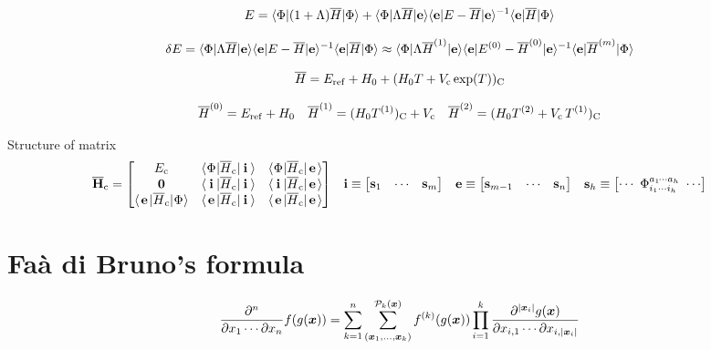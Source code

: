 \documentclass[11pt]{article}
\numberwithin{equation}{section}
\newcommand{\fwkt}[1]{\kt{\makebox[0.8em][c]{\ensuremath{#1}}}}
\newcommand{\fwbr}[1]{\br{\makebox[0.8em][c]{\ensuremath{#1}}}}
\begin{document}
\begin{align*}
  E
=
  \langle\Phi |
  (
    1
  +
    \Lambda 
  )
  \overline{H}
  |\Phi \rangle
+
  \langle\Phi |\Lambda \overline{H}|\mathbf{e}\rangle
  \langle\mathbf{e}|E - \overline{H}|\mathbf{e}\rangle^{-1}
  \langle\mathbf{e}|\overline{H}|\Phi \rangle
\end{align*}

\begin{align*}
  \delta  E
=
  \langle\Phi |\Lambda \overline{H}|\mathbf{e}\rangle
  \langle\mathbf{e}|E - \overline{H}|\mathbf{e}\rangle^{-1}
  \langle\mathbf{e}|\overline{H}|\Phi \rangle
\approx
  \langle\Phi |\Lambda \overline{H}^{(1)}|\mathbf{e}\rangle
  \langle\mathbf{e}|E^{(0)} - \overline{H}^{(0)}|\mathbf{e}\rangle^{-1}
  \langle\mathbf{e}|\overline{H}^{(m)}|\Phi \rangle
\end{align*}


\begin{align}
  \overline{H}
=
  E_{\mathrm{ref}}
+
  H_0
+
  (
    H_0
    T
  +
    V_{\mathrm{c}}\,
    \mathrm{exp}(T)
  )_{\mathrm{C}}
\end{align}

\begin{align}
  \overline{H}^{(0)}
=
  E_{\mathrm{ref}}
+
  H_0
&&
  \overline{H}^{(1)}
=
  (H_0T^{(1)})_{\mathrm{C}}
+
  V_{\mathrm{c}}
&&
  \overline{H}^{(2)}
=
  (
    H_0
    T^{(2)}
  +
    V_{\mathrm{c}}\,
    T^{(1)}
  )_{\mathrm{C}}
\end{align}

Structure of matrix
\begin{align*}
  \ol{\bo{H}}_\mr{c}
=
\pma{
  E_\mr{c} & \fwbr{\F}\ol{H}_\mr{c}\fwkt{\bo{i}} & \fwbr{\F}\ol{H}_\mr{c}\fwkt{\bo{e}} \\
  \bo{0} & \fwbr{\bo{i}}\ol{H}_\mr{c}\fwkt{\bo{i}} & \fwbr{\bo{i}}\ol{H}_\mr{c}\fwkt{\bo{e}} \\
  \fwbr{\bo{e}}\ol{H}_\mr{c}\fwkt{\F} & \fwbr{\bo{e}}\ol{H}_\mr{c}\fwkt{\bo{i}} & \fwbr{\bo{e}}\ol{H}_\mr{c}\fwkt{\bo{e}} \\
}
&&
  \bo{i}
\equiv
\pma{
  \bo{s}_1 & \cd & \bo{s}_m
}
&&
  \bo{e}
\equiv
\pma{
  \bo{s}_{m-1} & \cd & \bo{s}_n
}
&&
  \bo{s}_h
\equiv
\pma{
  \cd
\
  \F_{i_1\cd i_h}^{a_1\hspace{-1pt}\cd a_h}
\
  \cd
}
\end{align*}

\newpage
\appendix
\section{Fa\`a di Bruno's formula}

\begin{thm}
\begin{align}
  \pd{^n}{x_1\cd \pt x_n}
  f(g(\bm{x}))
=
  \sum_{k=1}^n
  \sum_{(\bm{x}_1,\ld,\bm{x}_k)}^{\mc{P}_k(\bm{x})}
  f\ord{k}(g(\bm{x}))
  \prod_{i=1}^k
  \pd{
    ^{|\bm{x}_i|}
    g(\bm{x})
  }{
    x_{i,1}
  \cd
    \pt
    x_{i,|\bm{x}_i|}
  }
\end{align}
\end{thm}
\end{document}
